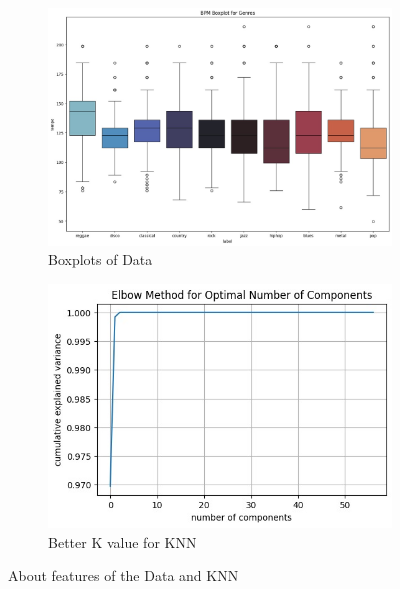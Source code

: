 \documentclass[a4paper, 24pt]{article}
\begin{document}
\begin{figure}[H]
    \centering
    \begin{subfigure}{0.45\textwidth}
        \centering
        \includegraphics[width=0.5\linewidth]{WhatsApp Image 2024-04-21 at 02.52.50_d518179f.jpg}
        \caption{Boxplots of Data}
        \label{fig:boxplots_class}
    \end{subfigure}
    \hfill
    \begin{subfigure}{0.45\textwidth}
        \centering
        \includegraphics[width=0.5\linewidth]{WhatsApp Image 2024-04-21 at 02.53.05_40714caa.jpg}
        \caption{Better K value for KNN}
        \label{fig:k_knn}
    \end{subfigure}
    \caption{About features of the Data and KNN}
    \label{fig:combined_plots0}
\end{figure}
\end{document}
